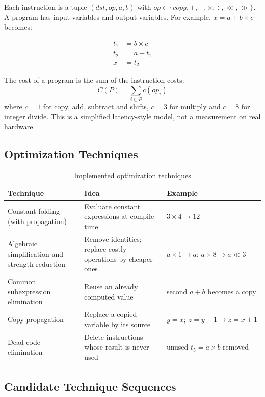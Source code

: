 \documentclass[12pt,a4paper]{article}
\begin{document}
Each instruction is a tuple $(dst, op, a, b)$ with
$op \in \{copy, +, -, \times, \div, \ll, \gg\}$. A program has input variables
and output variables. For example, $x = a + b \times c$ becomes:

\begin{align}
t_1 &= b \times c\\
t_2 &= a + t_1\\
x &= t_2
\end{align}

The cost of a program is the sum of the instruction costs:
\begin{equation}
C(P) = \sum_{i \in P} c(op_i)
\end{equation}
where $c = 1$ for copy, add, subtract and shifts, $c = 3$ for multiply and
$c = 8$ for integer divide. This is a simplified latency-style model, not a
measurement on real hardware.

\subsection{Optimization Techniques}

\begin{table}[H]
\centering
\caption{Implemented optimization techniques}
\label{tab:techniques}
\small
\begin{tabularx}{\textwidth}{p{3.8cm}Xp{4.2cm}}
\toprule
\textbf{Technique} & \textbf{Idea} & \textbf{Example}\\
\midrule
Constant folding (with propagation) & Evaluate constant expressions at compile time & $3 \times 4 \rightarrow 12$\\
Algebraic simplification and strength reduction & Remove identities; replace costly operations by cheaper ones & $a \times 1 \rightarrow a$; $a \times 8 \rightarrow a \ll 3$\\
Common subexpression elimination & Reuse an already computed value & second $a+b$ becomes a copy\\
Copy propagation & Replace a copied variable by its source & $y=x;\ z=y+1 \rightarrow z=x+1$\\
Dead-code elimination & Delete instructions whose result is never used & unused $t_5 = a \times b$ removed\\
\bottomrule
\end{tabularx}
\end{table}

\subsection{Candidate Technique Sequences}
\end{document}
